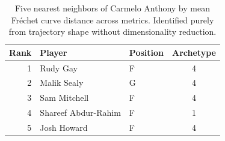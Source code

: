 \begin{table}[htbp]
  \centering\small
  \begin{tabular}{rllc}
    \toprule
    Rank & Player & Position & Archetype \\
    \midrule
    1 & Rudy Gay & F & 4 \\
    2 & Malik Sealy & G & 4 \\
    3 & Sam Mitchell & F & 4 \\
    4 & Shareef Abdur-Rahim & F & 1 \\
    5 & Josh Howard & F & 4 \\
    \bottomrule
  \end{tabular}
  \caption{Five nearest neighbors of Carmelo Anthony by mean Fr\'{e}chet curve distance across metrics. Identified purely from trajectory shape without dimensionality reduction.}
  \label{tab:Carmelo_Anthony_frechet_curve_neighbors}
\end{table}

